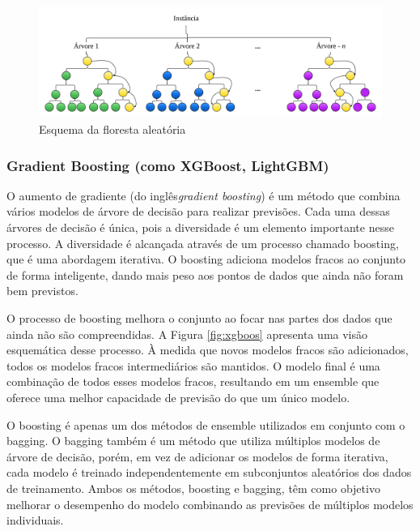 \begin{figure}[H]
	\centering
	\caption{Esquema da floresta aleatória}
	\label{fig:rf}
	\includegraphics[width=\linewidth]{Modelos/Figuras/RF}
	
\end{figure}


\subsubsection{Gradient Boosting (como XGBoost, LightGBM)}\label{subsubsec:lgbxgb}

O aumento de gradiente (do inglês\textit{gradient boosting}) é um método que combina vários modelos de árvore de decisão para realizar previsões. Cada uma dessas árvores de decisão é única, pois a diversidade é um elemento importante nesse processo. A diversidade é alcançada através de um processo chamado boosting, que é uma abordagem iterativa. O boosting adiciona modelos fracos ao conjunto de forma inteligente, dando mais peso aos pontos de dados que ainda não foram bem previstos. 

O processo de boosting melhora o conjunto ao focar nas partes dos dados que ainda não são compreendidas. A Figura \ref{fig:xgboos} apresenta uma visão esquemática desse processo. À medida que novos modelos fracos são adicionados, todos os modelos fracos intermediários são mantidos. O modelo final é uma combinação de todos esses modelos fracos, resultando em um ensemble que oferece uma melhor capacidade de previsão do que um único modelo.

O boosting é apenas um dos métodos de ensemble utilizados em conjunto com o bagging. O bagging também é um método que utiliza múltiplos modelos de árvore de decisão, porém, em vez de adicionar os modelos de forma iterativa, cada modelo é treinado independentemente em subconjuntos aleatórios dos dados de treinamento. Ambos os métodos, boosting e bagging, têm como objetivo melhorar o desempenho do modelo combinando as previsões de múltiplos modelos individuais.


